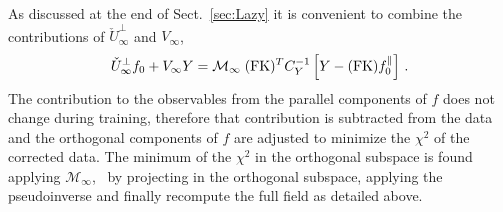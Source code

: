 As discussed at the end of Sect.~\ref{sec:Lazy} it is convenient to combine the
contributions of $\check{U}^\perp_{\infty}$ and $V_{\infty}$,
\begin{align}
    \label{eq:DataCorrectedInferenceAtInfty}
    \check{U}^{\perp}_{\infty} f_{0} + V_{\infty} Y 
        = \mathcal{M}_{\infty}\; (\mathrm{FK})^T C_Y^{-1} \left[Y - (\mathrm{FK}) f_{0}^{\parallel}\right]\, .
\end{align}
The contribution to the observables from the parallel components of $f$ does not
change during training, therefore that contribution is subtracted from the data
and the orthogonal components of $f$ are adjusted to minimize the $\chi^2$ of
the corrected data. The minimum of the $\chi^2$ in the orthogonal subspace is
found applying $\mathcal{M}_{\infty}$, \ie\ by projecting in the orthogonal
subspace, applying the pseudoinverse and finally recompute the full field as
detailed above.


\FloatBarrier